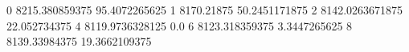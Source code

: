 0 8215.380859375 95.4072265625
1 8170.21875 50.2451171875
2 8142.0263671875 22.052734375
4 8119.9736328125 0.0
6 8123.318359375 3.3447265625
8 8139.33984375 19.3662109375
